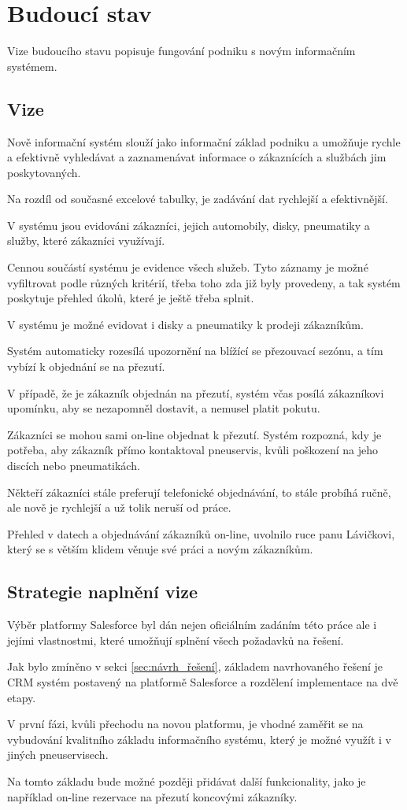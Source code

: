 \section{Budoucí stav}
Vize budoucího stavu popisuje fungování podniku s novým informačním systémem.
\subsection{Vize}
Nově informační systém slouží jako informační základ podniku a umožňuje rychle a efektivně vyhledávat a zaznamenávat informace o zákaznících a službách jim poskytovaných.

Na rozdíl od současné excelové tabulky, je zadávání dat rychlejší a efektivnější.

V systému jsou evidováni zákazníci, jejich automobily, disky, pneumatiky a služby, které zákazníci využívají.

Cennou součástí systému je evidence všech služeb. Tyto záznamy je možné vyfiltrovat podle různých kritérií, třeba toho zda již byly provedeny, a tak systém poskytuje přehled úkolů, které je ještě třeba splnit. 

V systému je možné evidovat i disky a pneumatiky k prodeji zákazníkům.

Systém automaticky rozesílá upozornění na blížící se přezouvací sezónu, a tím vybízí k objednání se na přezutí.

V případě, že je zákazník objednán na přezutí, systém včas posílá zákazníkovi upomínku, aby se nezapomněl dostavit, a nemusel platit pokutu.

Zákazníci se mohou sami on-line objednat k přezutí. Systém rozpozná, kdy je potřeba, aby zákazník přímo kontaktoval pneuservis, kvůli poškození na jeho discích nebo pneumatikách.

Někteří zákazníci stále preferují telefonické objednávání, to stále probíhá ručně, ale nově je rychlejší a už tolik neruší od práce.

Přehled v datech a objednávání zákazníků on-line, uvolnilo ruce panu Lávičkovi, který se s větším klidem věnuje své práci a novým zákazníkům.
\subsection{Strategie naplnění vize} \label{subsec:strategie_naplnění_vize}
Výběr platformy Salesforce byl dán nejen oficiálním zadáním této práce ale i jejími vlastnostmi, které umožňují splnění všech požadavků na řešení.

Jak bylo zmíněno v sekci \ref{sec:návrh_řešení}, základem navrhovaného řešení je CRM systém postavený na platformě Salesforce a rozdělení implementace na dvě etapy.

V první fázi, kvůli přechodu na novou platformu, je vhodné zaměřit se na vybudování kvalitního základu informačního systému, který je možné využít i v jiných pneuservisech.

Na tomto základu bude možné později přidávat další funkcionality, jako je například on-line rezervace na přezutí koncovými zákazníky.
